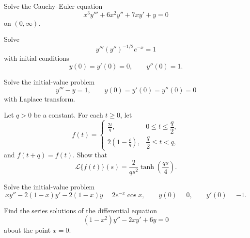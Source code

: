 \documentclass[11pt,oneside]{article}
\begin{document}
\begin{problem}
Solve the Cauchy--Euler equation
\[
x^3y'''+6x^2y''+7xy'+y=0
\]
on $(0,\infty)$.
\end{problem}

\begin{problem}
Solve
\[
y'''(y'')^{-1/2}e^{-x}=1
\]
with initial conditions
\[
y(0)=y'(0)=0,
\qquad
y''(0)=1.
\]
\end{problem}

\begin{problem}
Solve the initial-value problem
\[
y'''-y=1,
\qquad
y(0)=y'(0)=y''(0)=0
\]
with Laplace transform.
\end{problem}

\begin{problem}
Let $q>0$ be a constant. For each $t\ge0$, let
\[
f(t)=
\begin{cases}
\displaystyle\frac{2t}{q}, & 0\le t\le\dfrac q2,\\[0.8em]
\displaystyle 2\left(1-\frac tq\right), & \dfrac q2\le t<q,
\end{cases}
\]
and $f(t+q)=f(t)$. Show that
\[
\mathcal{L}\{f(t)\}(s)
=\frac{2}{qs^2}\tanh\left(\frac{qs}{4}\right).
\]
\end{problem}

\begin{problem}
Solve the initial-value problem
\[
xy''-2(1-x)y'-2(1-x)y=2e^{-x}\cos x,
\qquad
y(0)=0,
\qquad
y'(0)=-1.
\]
\end{problem}

\begin{problem}
Find the series solutions of the differential equation
\[
(1-x^2)y''-2xy'+6y=0
\]
about the point $x=0$.
\end{problem}
\end{document}
